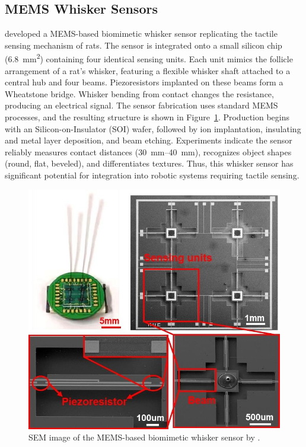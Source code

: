 \subsection{MEMS Whisker Sensors}
\textcite{9114501} developed a MEMS-based biomimetic whisker sensor replicating the tactile sensing mechanism of rats.
The sensor is integrated onto a small silicon chip (\SI{6.8}{\milli\meter\squared}) containing four identical sensing units.
Each unit mimics the follicle arrangement of a rat's whisker, featuring a flexible whisker shaft attached to a central hub and four beams.
Piezoresistors implanted on these beams form a Wheatstone bridge.
Whisker bending from contact changes the resistance, producing an electrical signal.
The sensor fabrication uses standard MEMS processes, and the resulting structure is shown in Figure~\ref{fig:mems-whisker}.
Production begins with an Silicon-on-Insulator (SOI) wafer, followed by ion implantation, insulating and metal layer deposition, and beam etching.
Experiments indicate the sensor reliably measures contact distances (\qtyrange{30}{40}{\milli\metre}), recognizes object shapes (round, flat, beveled), and differentiates textures.
Thus, this whisker sensor has significant potential for integration into robotic systems requiring tactile sensing.

\begin{figure}[htb]
    \centering
    \includegraphics[height=0.4\textheight]{figures/mems-whisker}
    \caption{SEM image of the MEMS-based biomimetic whisker sensor by \textcite{9114501}.}
    \label{fig:mems-whisker}
\end{figure}

